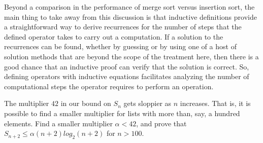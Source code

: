 Beyond a comparison in the performance of merge sort
versus insertion sort, the main thing to take away from this discussion
is that inductive definitions provide a straightforward way to
derive recurrences for the number of steps that the defined operator
takes to carry out a computation.
If a solution to the recurrences can be found,
whether by guessing or by using one of a host of solution methods
that are beyond the scope of the treatment here,
then there is a good chance that an 
inductive proof
can verify that the solution is correct.
So, defining operators with inductive equations
facilitates analyzing the number of computational
steps the operator requires to perform an operation.

\begin{ExerciseList}

\Exercise
The multiplier $42$ in our bound on $S_n$ gets sloppier as $n$ increases.
That is, it is possible to find a smaller multiplier
for lists with more than, say, a hundred elements.
Find a smaller multiplier $\alpha < 42$, and prove that
$S_{n+2} \leq \alpha(n+2)log_2(n+2)$ for $n > 100$.

\end{ExerciseList} 